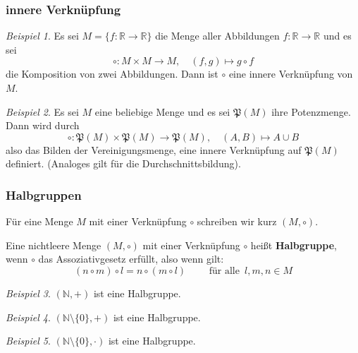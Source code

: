 \documentclass[hyperref={pdfpagelabels=false}]{beamer}
\theoremstyle{plain}%
\theoremstyle{definition}
\theoremstyle{remark}
\newtheorem*{beispiel}{Beispiel}
\begin{document}
\begin{frame}
\frametitle{innere Verknüpfung}

\begin{beispiel} 
Es sei $M = \{f: \mathbb R \longrightarrow \mathbb R \}$ die Menge aller Abbildungen 
$f: \mathbb R \longrightarrow \mathbb R$ und es sei  
  	$$ \circ : M \times M \longrightarrow M, \quad (f, g) \longmapsto g \circ f $$
die Komposition von zwei Abbildungen. Dann ist $\circ$ eine innere Verknüpfung von $M$.
\end{beispiel}

\pause 

\begin{beispiel} Es sei $M$ eine beliebige Menge und es sei 
$\mathfrak{P}(M)$ ihre Potenzmenge. Dann wird durch
  	$$ \circ : \mathfrak{P}(M) \times \mathfrak{P}(M) \longrightarrow \mathfrak{P}(M), \quad
    	(A,B) \longmapsto A \cup B $$
also das Bilden der Vereinigungsmenge, eine innere Verknüpfung auf $\mathfrak{P}(M)$ definiert.
(Analoges gilt für die Durchschnittsbildung).
\end{beispiel}

\end{frame}

\begin{frame}
\frametitle{Halbgruppen}
Für eine Menge $M$ mit einer Verknüpfung $\circ$ schreiben wir kurz $(M, \circ)$.

\pause

\begin{definition} Eine nichtleere Menge $(M, \circ)$ mit einer Verknüpfung $ \circ$ heißt 
\textbf{Halbgruppe}, 
wenn $\circ$ das Assoziativgesetz erfüllt, also wenn gilt:
  	$$ (n \circ m) \circ l = n \circ (m \circ l) \qquad \textrm{ für alle } \, l, m, n \in M $$ 
\end{definition}

\pause 
\begin{beispiel} $(\mathbb N, +)$ ist eine Halbgruppe. \end{beispiel}

\pause 
\begin{beispiel} $(\mathbb N \setminus \{ 0 \}, +)$ ist eine Halbgruppe. \end{beispiel}

\pause
\begin{beispiel} $(\mathbb N \setminus \{ 0 \}, \cdot)$ ist eine Halbgruppe. \end{beispiel}

\end{frame}
\end{document}
